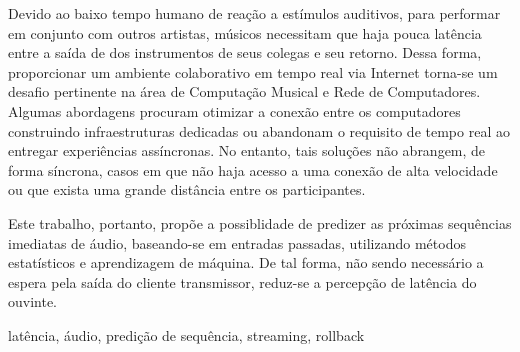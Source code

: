 \resumo
{}
Devido ao baixo tempo humano de reação a estímulos auditivos, para performar em conjunto com outros artistas, músicos necessitam que haja pouca latência entre a saída de dos instrumentos de seus colegas e seu retorno. Dessa forma, proporcionar um ambiente colaborativo em tempo real via Internet torna-se um desafio pertinente na área de Computação Musical e Rede de Computadores. Algumas abordagens procuram otimizar a conexão entre os computadores construindo infraestruturas dedicadas ou abandonam o requisito de tempo real ao entregar experiências assíncronas. No entanto, tais soluções não abrangem, de forma síncrona, casos em que não haja acesso a uma conexão de alta velocidade ou que exista uma grande distância entre os participantes.

Este trabalho, portanto, propõe a possiblidade de predizer as próximas sequências imediatas de áudio, baseando-se em entradas passadas, utilizando métodos estatísticos e aprendizagem de máquina. De tal forma, não sendo necessário a espera pela saída do cliente transmissor, reduz-se a percepção de latência do ouvinte.
\begin{keywords}
latência, áudio, predição de sequência, streaming, rollback
\end{keywords}

